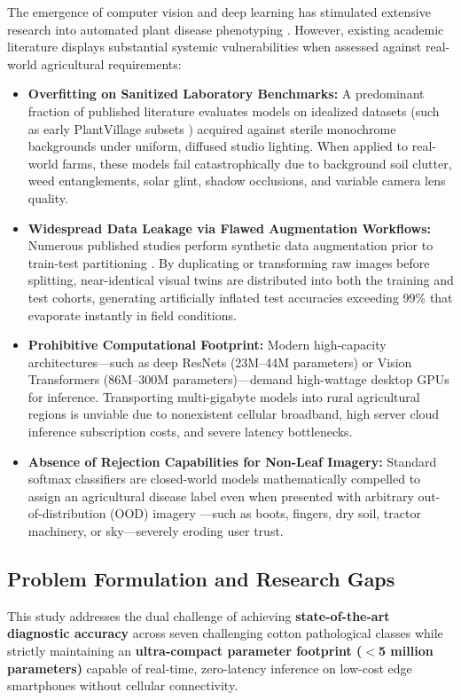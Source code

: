 \documentclass[journal,10pt,twocolumn]{IEEEtran}
\begin{document}
The emergence of computer vision and deep learning has stimulated extensive research into automated plant disease phenotyping \cite{kamilaris2018deep, too2019comparative}. However, existing academic literature displays substantial systemic vulnerabilities when assessed against real-world agricultural requirements:
\begin{itemize}[leftmargin=*]
    \item \textbf{Overfitting on Sanitized Laboratory Benchmarks:} A predominant fraction of published literature evaluates models on idealized datasets (such as early PlantVillage subsets \cite{hughes2015open, mohanty2016using}) acquired against sterile monochrome backgrounds under uniform, diffused studio lighting. When applied to real-world farms, these models fail catastrophically due to background soil clutter, weed entanglements, solar glint, shadow occlusions, and variable camera lens quality.
    \item \textbf{Widespread Data Leakage via Flawed Augmentation Workflows:} Numerous published studies perform synthetic data augmentation prior to train-test partitioning \cite{bishshash2024sar}. By duplicating or transforming raw images before splitting, near-identical visual twins are distributed into both the training and test cohorts, generating artificially inflated test accuracies exceeding 99\% that evaporate instantly in field conditions.
    \item \textbf{Prohibitive Computational Footprint:} Modern high-capacity architectures---such as deep ResNets \cite{he2016deep} (23M--44M parameters) or Vision Transformers \cite{dosovitskiy2021image} (86M--300M parameters)---demand high-wattage desktop GPUs for inference. Transporting multi-gigabyte models into rural agricultural regions is unviable due to nonexistent cellular broadband, high server cloud inference subscription costs, and severe latency bottlenecks.
    \item \textbf{Absence of Rejection Capabilities for Non-Leaf Imagery:} Standard softmax classifiers are closed-world models mathematically compelled to assign an agricultural disease label even when presented with arbitrary out-of-distribution (OOD) imagery \cite{hendrycks2016baseline}---such as boots, fingers, dry soil, tractor machinery, or sky---severely eroding user trust.
\end{itemize}

\subsection{Problem Formulation and Research Gaps}
This study addresses the dual challenge of achieving \textbf{state-of-the-art diagnostic accuracy} across seven challenging cotton pathological classes while strictly maintaining an \textbf{ultra-compact parameter footprint ($<$5 million parameters)} capable of real-time, zero-latency inference on low-cost edge smartphones without cellular connectivity. 
\end{document}
